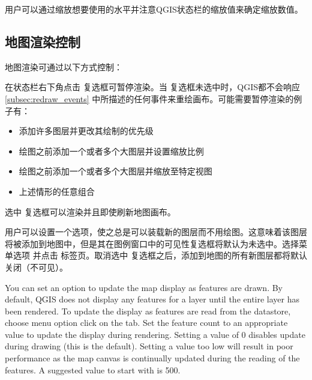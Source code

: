用户可以通过缩放想要使用的水平并注意QGIS状态栏的缩放值来确定缩放数值。 

\subsection{地图渲染控制}\label{label_controlmap}

地图渲染可通过以下方式控制：

\label{label_suspendrender}

在状态栏右下角点击  复选框可暂停渲染。当  复选框未选中时，QGIS都不会响应 \ref{subsec:redraw_events} 中所描述的任何事件来重绘画布。可能需要暂停渲染的例子有：

\begin{itemize}

\item 添加许多图层并更改其绘制的优先级
\item 绘图之前添加一个或者多个大图层并设置缩放比例
\item 绘图之前添加一个或者多个大图层并缩放至特定视图
\item 上述情形的任意组合
\end{itemize}

选中  复选框可以渲染并且即使刷新地图画布。

\label{label_settinglayer}

用户可以设置一个选项，使之总是可以装载新的图层而不用绘图。这意味着该图层将被添加到地图中，但是其在图例窗口中的可见性复选框将默认为未选中。选择菜单选项   \arrow {} 并点击  标签页。取消选中  复选框之后，添加到地图的所有新图层都将默认关闭（不可见）。

%
%

\label{label_updatemap}

You can set an option to update the map display as features are drawn. By
default, QGIS does not display any features for a layer until the entire
layer has been rendered. To update the display as features are read from the
datastore, choose menu option  \arrow {}
click on the  tab. Set the feature count to an
appropriate value to update the display during rendering. Setting a value of 0
disables update during drawing (this is the default). Setting a value too low
will result in poor performance as the map canvas is continually updated
during the reading of the features. A suggested value to start with is 500.

